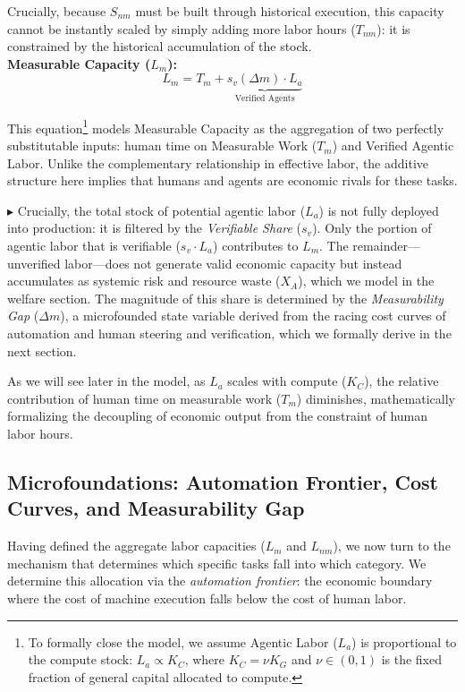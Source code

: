 \documentclass[12pt, letter]{article}
\begin{document}
Crucially, because $S_{nm}$ must be built through historical execution, this capacity cannot be instantly scaled by simply adding more labor hours ($T_{nm}$): it is constrained by the historical accumulation of the stock.\\
    
\textbf{Measurable Capacity ($L_m$):}
    \begin{equation}
        L_m = T_m + \underbrace{s_v(\Delta m) \cdot L_a}_{\text{Verified Agents}}
    \end{equation}


This equation\footnote{To formally close the model, we assume Agentic Labor ($L_{a}$) is proportional to the compute stock: $L_{a} \propto K_{C}$, where $K_C = \nu K_{G}$ and $\nu \in (0,1)$ is the fixed fraction of general capital allocated to compute.} models Measurable Capacity as the aggregation of two perfectly substitutable inputs: human time on Measurable Work ($T_m$) and Verified Agentic Labor. Unlike the complementary relationship in effective labor, the additive structure here implies that humans and agents are economic rivals for these tasks. 

$\blacktriangleright$ Crucially, the total stock of potential agentic labor ($L_a$) is not fully deployed into production: it is filtered by the \textit{Verifiable Share} ($s_v$). Only the portion of agentic labor that is verifiable ($s_v \cdot L_a$) contributes to $L_m$. The remainder—unverified labor—does not generate valid economic capacity but instead accumulates as systemic risk and resource waste ($X_A$), which we model in the welfare section. The magnitude of this share is determined by the \emph{Measurability Gap} ($\Delta m$), a microfounded state variable derived from the racing cost curves of automation and human steering and verification, which we formally derive in the next section. 

As we will see later in the model, as $L_a$ scales with compute ($K_C$), the relative contribution of human time on measurable work ($T_m$) diminishes, mathematically formalizing the decoupling of economic output from the constraint of human labor hours.



\subsection{Microfoundations: Automation Frontier, Cost Curves, and Measurability Gap}\label{sec:microfoundations}

Having defined the aggregate labor capacities ($L_m$ and $L_{nm}$), we now turn to the mechanism that determines which specific tasks fall into which category. We determine this allocation via the \emph{automation frontier}: the economic boundary where the cost of machine execution falls below the cost of human labor.
\end{document}
